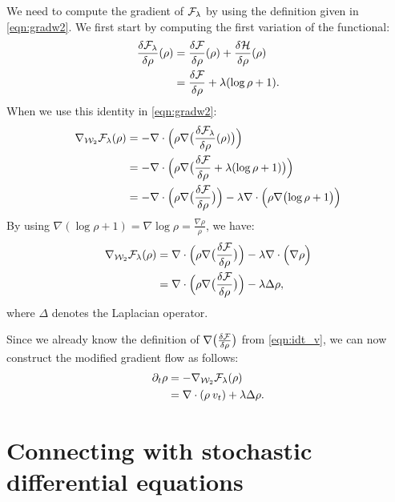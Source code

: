 \documentclass{article}
\newcommand{\W}{{\cal W}_2}
\newcommand{\F}{{\cal F}}
\newcommand{\He}{{\cal H}}
\begin{document}
We need to compute the gradient of $\F_\lambda$ by using the definition given in \eqref{eqn:gradw2}. We first start by computing the first variation of the functional:
\begin{align}
\frac{\delta \F_\lambda}{\delta \rho} (\rho ) &= \frac{\delta \F}{\delta \rho} (\rho ) + \frac{\delta \He}{\delta \rho} (\rho ) \\
&= \frac{\delta \F}{\delta \rho} + \lambda  (\log \rho +1 ) . 
\end{align}
When we use this identity in \eqref{eqn:gradw2}:
\begin{align}
\nabla_{\W} \F_\lambda(\rho) &= -\nabla \cdot \Bigl( \rho \nabla \bigl( \frac{\delta \F_\lambda}{\delta \rho}(\rho) \bigr) \Bigr) \\ 
&= -\nabla \cdot \Bigl( \rho \nabla \bigl( \frac{\delta \F}{\delta \rho} +  \lambda  (\log \rho +1 ) \bigr) \Bigr) \\ 
&= -\nabla \cdot \Bigl( \rho \nabla \bigl( \frac{\delta \F}{\delta \rho} \bigr) \Bigr) -  \lambda \nabla \cdot \Bigl( \rho \nabla \bigl( \log \rho +1  \bigr) \Bigr)
\end{align}
By using $\nabla ( \log \rho +1  ) = \nabla \log \rho = \frac{\nabla \rho}{\rho} $, we have:
\begin{align}
\nabla_{\W} \F_\lambda(\rho) &= \nabla \cdot \Bigl( \rho \nabla \bigl( \frac{\delta \F}{\delta \rho} \bigr) \Bigr) -  \lambda \nabla \cdot \Bigl( \nabla \rho \Bigr) \\
&= \nabla \cdot \Bigl( \rho \nabla \bigl( \frac{\delta \F}{\delta \rho} \bigr) \Bigr) -  \lambda \Delta \rho,
\end{align}
where $\Delta$ denotes the Laplacian operator. 

Since we already know the definition of $\nabla \bigl( \frac{\delta \F}{\delta \rho} \bigr)$ from \eqref{eqn:idt_v}, we can now construct the modified gradient flow as follows:
\begin{align}
\partial_t \rho &= - \nabla_{\W} \F_\lambda(\rho) \\
&=  \nabla \cdot (\rho \> v_t) + \lambda \Delta \rho. \label{eqn:gradflow_reg}
\end{align}

\section{Connecting with stochastic differential equations}
\end{document}
